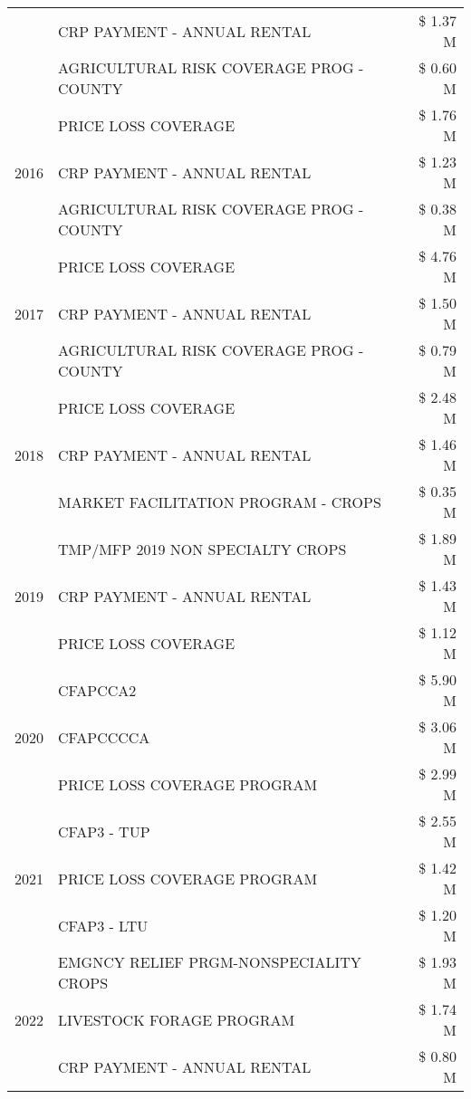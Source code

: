 \begin{tabular}{llr}
 & CRP PAYMENT - ANNUAL RENTAL & \$ 1.37 M \\
 & AGRICULTURAL RISK COVERAGE PROG - COUNTY & \$ 0.60 M \\
\cline{1-3}
\multirow[t]{3}{*}{2016} & PRICE LOSS COVERAGE & \$ 1.76 M \\
 & CRP PAYMENT - ANNUAL RENTAL & \$ 1.23 M \\
 & AGRICULTURAL RISK COVERAGE PROG - COUNTY & \$ 0.38 M \\
\cline{1-3}
\multirow[t]{3}{*}{2017} & PRICE LOSS COVERAGE & \$ 4.76 M \\
 & CRP PAYMENT - ANNUAL RENTAL & \$ 1.50 M \\
 & AGRICULTURAL RISK COVERAGE PROG - COUNTY & \$ 0.79 M \\
\cline{1-3}
\multirow[t]{3}{*}{2018} & PRICE LOSS COVERAGE & \$ 2.48 M \\
 & CRP PAYMENT - ANNUAL RENTAL & \$ 1.46 M \\
 & MARKET FACILITATION PROGRAM - CROPS & \$ 0.35 M \\
\cline{1-3}
\multirow[t]{3}{*}{2019} & TMP/MFP 2019 NON SPECIALTY CROPS & \$ 1.89 M \\
 & CRP PAYMENT - ANNUAL RENTAL & \$ 1.43 M \\
 & PRICE LOSS COVERAGE & \$ 1.12 M \\
\cline{1-3}
\multirow[t]{3}{*}{2020} & CFAPCCA2 & \$ 5.90 M \\
 & CFAPCCCCA & \$ 3.06 M \\
 & PRICE LOSS COVERAGE PROGRAM & \$ 2.99 M \\
\cline{1-3}
\multirow[t]{3}{*}{2021} & CFAP3 - TUP & \$ 2.55 M \\
 & PRICE LOSS COVERAGE PROGRAM & \$ 1.42 M \\
 & CFAP3 - LTU & \$ 1.20 M \\
\cline{1-3}
\multirow[t]{3}{*}{2022} & EMGNCY RELIEF PRGM-NONSPECIALITY CROPS & \$ 1.93 M \\
 & LIVESTOCK FORAGE PROGRAM & \$ 1.74 M \\
 & CRP PAYMENT - ANNUAL RENTAL & \$ 0.80 M \\
\cline{1-3}
\bottomrule
\end{tabular}
